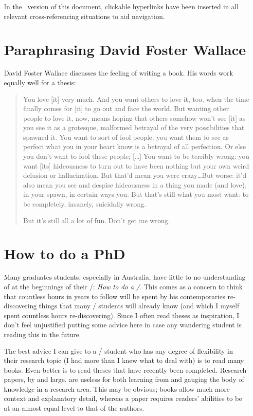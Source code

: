 In the \PDF\ version of this document, clickable hyperlinks have been inserted
in all relevant cross-referencing situations to aid navigation.




\section{Paraphrasing David Foster Wallace}

David Foster Wallace discusses the feeling of writing a book.
His words work equally well for a thesis:

\begin{quotation}
You love [it] very much. And you want others to love it, too, when the time
finally comes for [it] to go out and face the world. But wanting other people
to love it, now, means hoping that others somehow won't see [it] as you see it
\dash as a grotesque, malformed betrayal of the very possibilities that
spawned it. You want to sort of fool people: you want them to see as perfect
what you in your heart know is a betrayal of all perfection. Or else you don't
want to fool these people; [\dots] You want to be terribly wrong: you want [its]
hideousness to turn out to have been nothing but your own weird delusion or
hallucination. But that'd mean you were crazy\dots But worse: it'd also mean
you see and despise hideousness in a thing you made (and love), in your spawn,
in certain ways you. But that's still what you most want: to be completely,
insanely, suicidally wrong.

But it's still all a lot of fun. Don't get me wrong.
\end{quotation}

\section{How to do a PhD}

Many graduates students, especially in Australia, have little to no
understanding of at the beginnings of their \PhD/: \emph{How to do a
  \PhD/}. This comes as a concern to think that countless
hours in years to follow will be spent by his contemporaries
re-discovering things that many \PhD/ students will already know (and
which I myself spent countless hours re-discovering). Since I often
read theses as inspiration, I don't feel unjustified putting some advice here
in case any wandering student is reading this in the future.

The best advice I can give to a \PhD/ student who has any degree of
flexibility in their research topic (I had more than I knew what to
deal with) is to read many books. Even better is to read theses that
have recently been completed. Research papers, by and large, are
useless for both learning from and gauging the body of knowledge in a
research area. This may be obvious; books allow much more context and
explanatory detail, whereas a paper requires readers' abilities to be
at an almost equal level to that of the authors.
